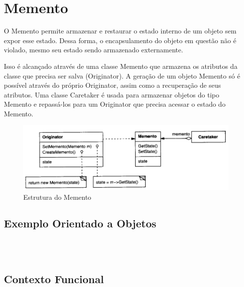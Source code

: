\section{Memento}

O Memento permite armazenar e restaurar o estado interno de um 
objeto sem expor esse estado. Dessa forma, o encapsulamento do 
objeto em questão não é violado, mesmo seu estado sendo armazenado 
externamente.

Isso é alcançado através de uma classe Memento que armazena os 
atributos da classe que precisa ser salva (Originator). A geração 
de um objeto Memento só é possível através do próprio Originator, 
assim como a recuperação de seus atributos. Uma classe Caretaker 
é usada para armazenar objetos do tipo Memento e repassá-los para 
um Originator que precisa acessar o estado do Memento.

\begin{figure}[htb]
	\caption{\label{memento_struct}Estrutura do Memento}
	\begin{center}
	    \includegraphics[scale=0.5]{5_padroes-contexto-funcional/5.3_comportamentais/5.3.06_memento/diagram.png}
	\end{center}
\end{figure}

\subsection*{Exemplo Orientado a Objetos}

\begin{lstlisting}[caption={Memento Orientação a Objetos},label=oomemento]



\end{lstlisting}

\subsection*{Contexto Funcional}

\begin{lstlisting}[caption={Memento Funcional},label=fpmemento]



\end{lstlisting}
